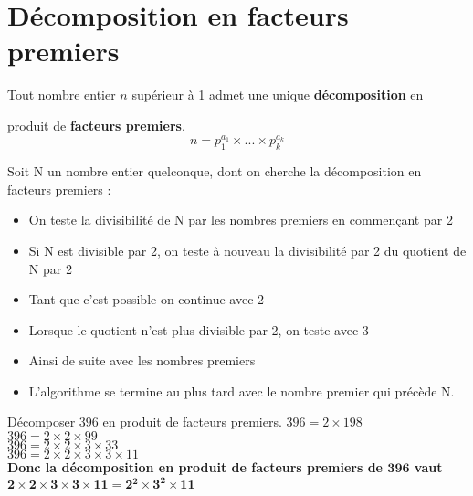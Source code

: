 \section{Décomposition en facteurs premiers}

\begin{propriete}[\admise]
Tout nombre entier $n$ supérieur à 1 admet une unique \textbf{décomposition} en 

produit de \textbf{facteurs premiers}.
$$n=p_1^{a_1}\times...\times p_k^{a_k}$$
\end{propriete}

\begin{methode}
    Soit N un nombre entier quelconque, dont on cherche la décomposition en facteurs premiers :
    \begin{itemize}
        \item On teste la divisibilité de N par les nombres premiers en commençant par 2
        \item Si N est divisible par 2, on teste à nouveau la divisibilité par 2 du quotient de N par 2
        \item Tant que c'est possible on continue avec 2
        \item Lorsque le quotient n'est plus divisible par 2, on teste avec 3
        \item Ainsi de suite avec les nombres premiers 
        \item L'algorithme se termine au plus tard avec le nombre premier qui précède N.
    \end{itemize}
    \exercice
    Décomposer $396$ en produit de facteurs premiers.
    \correction
    $396 = 2 \times  198$\\
    $396 = 2 \times  2 \times  99$\\
    $396 = 2 \times  2 \times  3 \times  33$\\
    $396 = 2 \times  2 \times  3 \times  3 \times  11$\\
    {\bfseries Donc la décomposition en produit de facteurs premiers de $\mathbf{396}$ vaut $\mathbf{2 \times  2 \times  3 \times  3 \times  11 = 2^2\times 3^2\times 11}$}

\end{methode}

